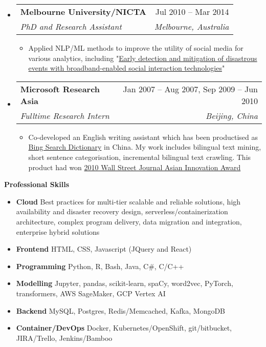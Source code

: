 \documentclass[letterpaper,12pt]{article}[leftmargin=*]
\makeatletter
\def \entryspacing {-0pt}
\renewcommand{\section}[2]{\vspace{5pt}
  \colorbox{secondary}{\color{white}\raggedbottom\normalsize\textbf{{#1}{\hspace{7pt}#2}}}
}
\newcommand{\resumeEntryStart}{\begin{itemize}[leftmargin=2.5mm]}
\newcommand{\resumeEntryEnd}{\end{itemize}\vspace{\entryspacing}}
\newcommand{\resumeItemListStart}{\begin{itemize}[leftmargin=4.5mm]}
\newcommand{\resumeItemListEnd}{\end{itemize}}
\newcommand{\resumeItem}[1]{
  \item\small{
    {#1 \vspace{-2pt}}
  }
}
\newcommand{\resumeEntryTSDL}[4]{
  \vspace{-1pt}\item[]
    \begin{tabularx}{0.97\textwidth}{X@{\hspace{60pt}}r}
      \textbf{\color{primary}#1} & {\firabook\color{accent}\small#2} \\
      \textit{\color{accent}\small#3} & \textit{\color{accent}\small#4} \\
    \end{tabularx}\vspace{-6pt}
}
\newcommand{\resumeEntryS}[2]{
  \item[]\small{
    \textbf{\color{primary}#1 }{ #2 \vspace{-6pt}}
  }
}
\makeatother
\begin{document}
  \resumeEntryStart
    \resumeEntryTSDL
      {Melbourne University/NICTA}{Jul 2010 -- Mar 2014}
      {PhD and Research Assistant}{Melbourne, Australia}
    \resumeItemListStart
      \resumeItem {Applied NLP/ML methods to improve the utility of social media for various analytics, including "\href{http://research.unimelb.edu.au/__data/assets/pdf_file/0006/1891914/IBES-2012-Annual-Report.pdf}{Early detection and mitigation of disastrous events with broadband-enabled social interaction technologies}"}
    \resumeItemListEnd
  \resumeEntryEnd

  \resumeEntryStart
    \resumeEntryTSDL
      {Microsoft Research Asia}{Jan 2007 -- Aug 2007, Sep 2009 -- Jun 2010}
      {Fulltime Research Intern}{Beijing, China}
    \resumeItemListStart
      \resumeItem {Co-developed an English writing assistant which has been productised as \href{https://www.bing.com/dict?FORM=Z9LH3}{Bing Search Dictionary} in China. My work includes bilingual text mining, short sentence categorisation, incremental bilingual text crawling. This product had won \href{https://www.wsj.com/articles/SB10001424052748703545604575406771145298614}{2010 Wall Street Journal Asian Innovation Award}}
    \resumeItemListEnd
  \resumeEntryEnd

\section{\faGears}{Professional Skills}
 \resumeEntryStart
  \resumeEntryS{Cloud}{Best practices for multi-tier scalable and reliable solutions, high availability and disaster recovery design, serverless/containerization architecture, complex program delivery, data migration and integration, enterprise hybrid solutions}
  \resumeEntryS{Frontend} {HTML, CSS, Javascript (JQuery and React)}
  \resumeEntryS{Programming} {Python, R, Bash, Java, C\#, C/C++}
  \resumeEntryS{Modelling} {Jupyter, pandas, scikit-learn, spaCy, word2vec, PyTorch, transformers, AWS SageMaker, GCP Vertex AI}
  \resumeEntryS{Backend} {MySQL, Postgres, Redis/Memcached, Kafka, MongoDB}
  \resumeEntryS{Container/DevOps} {Docker, Kubernetes/OpenShift, git/bitbucket, JIRA/Trello, Jenkins/Bamboo}
 \resumeEntryEnd
\end{document}
